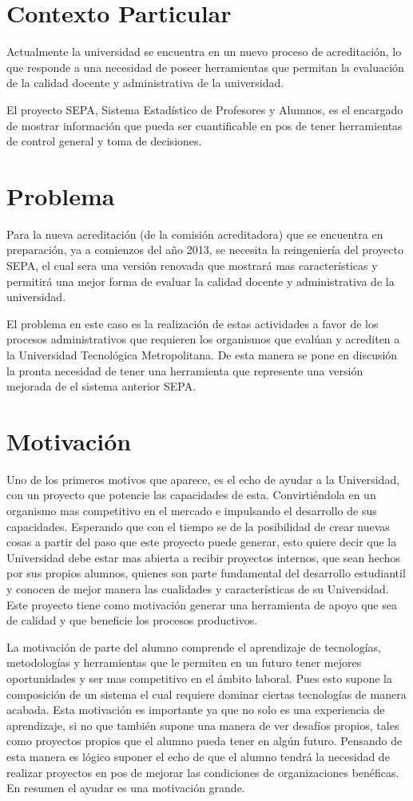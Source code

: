 \documentclass[a4paper,12pt,openany,oneside]{book}
\begin{document}
\section{Contexto Particular}
Actualmente la universidad se encuentra en un nuevo proceso de acreditación, lo que responde a una necesidad de poseer herramientas que permitan la evaluación de la calidad docente y administrativa de la universidad.

El proyecto SEPA, Sistema Estadístico de Profesores y Alumnos, es el encargado de mostrar información que pueda ser cuantificable en pos de tener herramientas de control general y toma de decisiones.
\section{Problema}
Para la nueva acreditación (de la comisión acreditadora) que se encuentra en preparación, ya a comienzos del año 2013, se necesita la reingeniería del proyecto SEPA, el cual sera una versión renovada que mostrará mas características y permitirá una mejor forma de evaluar la calidad docente y administrativa de la universidad.

El problema en este caso es la realización de estas actividades a favor de los procesos administrativos que requieren los organismos que evalúan y acrediten a la Universidad Tecnológica Metropolitana. De esta manera se pone en discusión la pronta necesidad de tener una herramienta que represente una versión mejorada de el sistema anterior SEPA.
\section{Motivación}
Uno de los primeros motivos que aparece, es el echo de ayudar a la Universidad, con un proyecto que potencie las capacidades de esta. Convirtiéndola en un organismo mas competitivo en el mercado e impulsando el desarrollo de sus capacidades. Esperando que con el tiempo se de la posibilidad de crear nuevas cosas a partir del paso que este proyecto puede generar, esto quiere decir que la Universidad debe estar mas abierta a recibir proyectos internos, que sean hechos por sus propios alumnos, quienes son parte fundamental del desarrollo estudiantil y conocen de mejor manera las cualidades y características de su Universidad. Este proyecto tiene como motivación generar una herramienta de apoyo que sea de calidad y que beneficie los procesos productivos.

La motivación de parte del alumno comprende el aprendizaje de tecnologías, metodologías y herramientas que le permiten en un futuro tener mejores oportunidades y ser mas competitivo en el ámbito laboral. Pues esto supone la composición de un sistema el cual requiere dominar ciertas tecnologías de manera acabada. Esta motivación es importante ya que no solo es una experiencia de aprendizaje, si no que también supone una manera de ver desafíos propios, tales como proyectos propios que el alumno pueda tener en algún futuro. Pensando de esta manera es lógico suponer el echo de que el alumno tendrá la necesidad de realizar proyectos en pos de mejorar las condiciones de organizaciones benéficas. En resumen el ayudar es una motivación grande.
\end{document}
